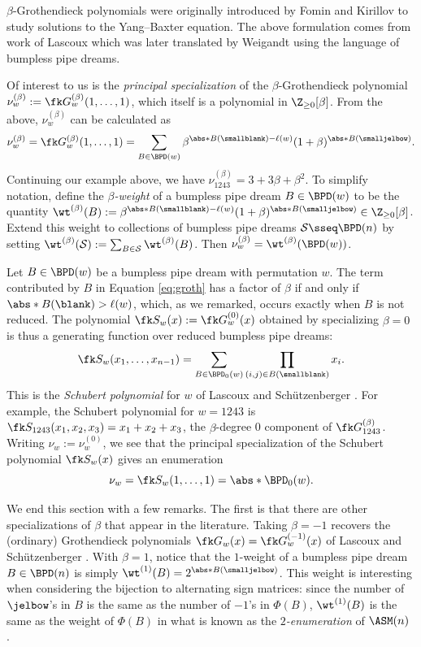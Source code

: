 $\beta$-Grothendieck polynomials were originally introduced by Fomin and Kirillov \cite{FK94} to study solutions to the Yang--Baxter equation.
The above formulation comes from work of Lascoux \cite{Las02} which was later translated by Weigandt \cite{Wei21} using the language of bumpless pipe dreams.

Of interest to us is the \textit{principal specialization} of the $\beta$-Grothendieck polynomial $\nu_w^{(\beta)} := \fk G_w^{(\beta)}(1,\dots,1)$, which itself is a polynomial in $\Z_{\geq 0}[\beta]$.
From the above, $\nu^{(\beta)}_w$ can be calculated as \[
    \nu^{(\beta)}_w = \fk G^{(\beta)}_w(1,\dots,1) =
    \sum_{B\in \BPD(w)}
    \beta^{\abs*{B(\smallblank)}-\ell(w)}
    (1+\beta)^{\abs*{B(\smalljelbow)}}.
\]
Continuing our example above, we have $\nu_{1243}^{(\beta)} = 3 + 3\beta + \beta^2$.
To simplify notation, define the \textit{$\beta$-weight} of a bumpless pipe dream $B\in \BPD(w)$ to be the quantity $\wt^{(\beta)}(B) := \beta^{\abs*{B(\smallblank)}-\ell(w)} (1+\beta)^{\abs*{B(\smalljelbow)}} \in \Z_{\geq 0}[\beta]$.
Extend this weight to collections of bumpless pipe dreams $\mathcal S\sseq \BPD(n)$ by setting $\wt^{(\beta)}(\mathcal S) := \sum_{B\in \mathcal S} \wt^{(\beta)}(B)$.
Then $\nu^{(\beta)}_w = \wt^{(\beta)}(\BPD(w))$.

Let $B\in \BPD(w)$ be a bumpless pipe dream with permutation $w$.
The term contributed by $B$ in Equation \ref{eq:groth} has a factor of $\beta$ if and only if $\abs*{B(\blank)} > \ell(w)$, which, as we remarked, occurs exactly when $B$ is not reduced.
The polynomial $\fk S_w(x) := \fk G^{(0)}_w(x)$ obtained by specializing $\beta = 0$ is thus a generating function over reduced bumpless pipe dreams: \[
    \fk S_w(x_1,\dots,x_{n-1}) =
    \sum_{B\in \BPD_0(w)}
    \prod_{(i,j)\in B(\smallblank)} x_i.
\]
This is the \textit{Schubert polynomial} for $w$ of Lascoux and Sch\"utzenberger \cite{LS82a,LLS21}.
For example, the Schubert polynomial for $w = 1243$ is $\fk S_{1243}(x_1,x_2,x_3) = x_1+x_2+x_3$, the $\beta$-degree 0 component of $\fk G_{1243}^{(\beta)}$.
Writing $\nu_w := \nu^{(0)}_w$, we see that the principal specialization of the Schubert polynomial $\fk S_w(x)$ gives an enumeration \[
    \nu_w = \fk S_w(1,\dots,1) = \abs*{\BPD_0(w)}.
\]

We end this section with a few remarks.
The first is that there are other specializations of $\beta$ that appear in the literature.
Taking $\beta = -1$ recovers the (ordinary) Grothendieck polynomials $\fk G_w(x) = \fk G_w^{(-1)}(x)$ of Lascoux and Sch\"utzenberger \cite{LS82b}.
With $\beta = 1$, notice that the $1$-weight of a bumpless pipe dream $B\in \BPD(n)$ is simply $\wt^{(1)}(B) = 2^{\abs*{B(\smalljelbow)}}$.
This weight is interesting when considering the bijection to alternating sign matrices:
since the number of $\jelbow$'s in $B$ is the same as the number of $-1$'s in $\Phi(B)$, $\wt^{(1)}(B)$ is the same as the weight of $\Phi(B)$ in what is known as the \textit{$2$-enumeration} of $\ASM(n)$ \cite{EKLP92}.

